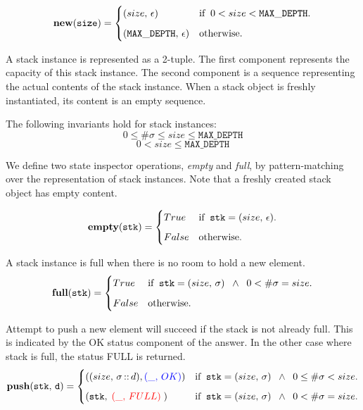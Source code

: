 \documentclass[10pt]{article}
\begin{document}
    \[
        \mathtt{\mathbf{new}(size)} = \begin{cases} (size, \,  \epsilon) &\mbox{if\;\;} 0 < size < \mathtt{MAX\_DEPTH}. \vspace*{6pt}\\ 
        (\mathtt{MAX\_DEPTH}, \, \epsilon) & \mbox{otherwise}. \end{cases} 
    \]
    
    A stack instance is represented as a 2-tuple. The first component represents the capacity of this stack instance. The second component is a sequence representing the actual contents of the stack instance. When a stack object is freshly instantiated, its content is an empty sequence. 

    The following invariants hold for stack instances:
    \[
        0 \leq \#\sigma \leq size \leq \mathtt{MAX\_DEPTH}
    \]
    \[
        0 < size \leq \mathtt{MAX\_DEPTH}
    \]

    We define two state inspector operations, \emph{empty} and \emph{full}, by pattern-matching over the representation of stack instances. Note that a freshly created stack object has empty content.
    
    \[
        \mathtt{\mathbf{empty}(stk)} = \begin{cases} True & \mbox{if\;\;} \mathtt{stk} = (size, \,\epsilon). \vspace*{6pt}\\ 
        False & \mbox{otherwise}. \end{cases} 
    \]
  
    A stack instance is full when there is no room to hold a new element.
    \[
        \mathtt{\mathbf{full}(stk)} = \begin{cases} True & \mbox{if\;\;} \mathtt{stk} = (size, \,\sigma) \;\; \wedge \;\; 0 < \#\sigma = size. \vspace*{6pt}\\
        False & \mbox{otherwise}. \end{cases} 
    \]

    Attempt to push a new element will succeed if the stack is not already full. This is indicated by the OK status component of the answer. In the other case where stack is full, the status FULL is returned.
    \[
        \mathtt{\mathbf{push}(stk,\, d)} = \begin{cases} ((size, \,\sigma \,\mathbf{::}\, d),  {\textcolor{blue}{(\_, \,OK)}}) & \mbox{if\;\;} \mathtt{stk} = (size, \,\sigma) \;\; \wedge \;\; 0 \leq \#\sigma < size. \vspace*{6pt}\\ 
        (\mathtt{stk},\;{\textcolor{red}{(\_, \,FULL)}} \; ) & \mbox{if\;\;} \mathtt{stk} = (size, \,\sigma) \;\; \wedge \;\; 0 < \#\sigma = size. \end{cases} 
    \]
\end{document}
